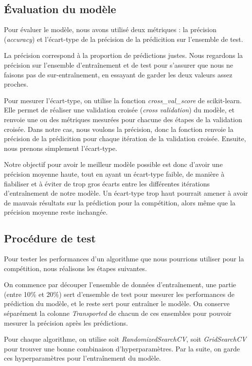 \documentclass[a4paper]{article}
\begin{document}
    \subsection{Évaluation du modèle}

    Pour évaluer le modèle, nous avons utilisé deux métriques : la précision ({\it accuracy}) et l'écart-type de la précision de la prédicition sur l'ensemble de test.

    La précision correspond à la proportion de prédictions justes. Nous regardons la précision sur l'ensemble d'entraînement et
    de test pour s'assurer que nous ne faisons pas de sur-entraînement, en essayant de garder les deux valeurs assez proches.

    Pour mesurer l'écart-type, on utilise la fonction {\it cross\_val\_score} de scikit-learn. Elle permet de réaliser une
    validation croisée ({\it cross validation}) du modèle, et renvoie une ou des métriques mesurées pour chacune des étapes de
    la validation croisée. Dans notre cas, nous voulons la précision, donc la fonction renvoie la précision de la prédicition
    pour chaque itération de la validation croisée.
    Ensuite, nous prenons simplement l'écart-type.

    Notre objectif pour avoir le meilleur modèle possible est donc d'avoir une précision moyenne haute, tout en ayant un écart-type faible,
    de manière à fiabiliser et à éviter de trop gros écarts entre les différentes itérations d'entraînement de notre modèle.
    Un écart-type trop haut pourrait amener à avoir de mauvais résultats sur la prédiction pour la compétition, alors même que la
    précision moyenne reste inchangée.

    \subsection{Procédure de test}

    Pour tester les performances d'un algorithme que nous pourrions utiliser pour la compétition, nous réalisons les étapes suivantes.

    On commence par découper l'ensemble de données d'entraînement, une partie (entre 10\% et 20\%) sert d'ensemble de test pour
    mesurer les performances de prédiction du modèle, et le reste sert pour entraîner le modèle.
    On conserve séparément la colonne {\it Transported} de chacun de ces ensembles pour pouvoir mesurer la précision après les prédictions.

    Pour chaque algorithme, on utilise soit {\it RandomizedSearchCV}, soit {\it GridSearchCV} pour trouver une bonne combinaison d'hyperparamètres.
    Par la suite, on garde ces hyperparamètres pour l'entraînement du modèle.
\end{document}
